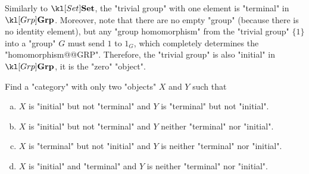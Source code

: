 \documentclass[main.tex]{subfiles}
\begin{document}
\begin{exmp}[$\catGrp$]
	Similarly to $\catSet$, the "trivial group" with one element is "terminal" in $\catGrp$. Moreover, note that there are no empty "group" (because there is no identity element), but any "group homomorphism" from the "trivial group" $\{1\}$ into a "group" $G$ must send $1$ to $1_G$, which completely determines the "homomorphism@@GRP". Therefore, the "trivial group" is also "initial" in $\catGrp$, it is the "zero" "object".
\end{exmp}
\begin{exer}\label{exer:duality:terminalinitial}
	Find a "category" with only two "objects" $X$ and $Y$ such that
	\begin{enumerate}[(a)]
		\item $X$ is "initial" but not "terminal" and $Y$ is "terminal" but not "initial".
		\item $X$ is "initial" but not "terminal" and $Y$ neither "terminal" nor "initial".
		\item $X$ is "terminal" but not "initial" and $Y$ is neither "terminal" nor "initial".
		\item $X$ is "initial" and "terminal" and $Y$ is neither "terminal" nor "initial".
	\end{enumerate} 
\end{exer}
\end{document}
